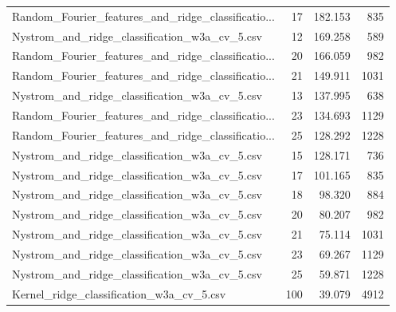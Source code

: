 \begin{tabularx}{\textwidth}{lrrr}
Random\_Fourier\_features\_and\_ridge\_classificatio... &       17 &  182.153 &           835 \\
     Nystrom\_and\_ridge\_classification\_w3a\_cv\_5.csv &       12 &  169.258 &           589 \\
Random\_Fourier\_features\_and\_ridge\_classificatio... &       20 &  166.059 &           982 \\
Random\_Fourier\_features\_and\_ridge\_classificatio... &       21 &  149.911 &          1031 \\
     Nystrom\_and\_ridge\_classification\_w3a\_cv\_5.csv &       13 &  137.995 &           638 \\
Random\_Fourier\_features\_and\_ridge\_classificatio... &       23 &  134.693 &          1129 \\
Random\_Fourier\_features\_and\_ridge\_classificatio... &       25 &  128.292 &          1228 \\
     Nystrom\_and\_ridge\_classification\_w3a\_cv\_5.csv &       15 &  128.171 &           736 \\
     Nystrom\_and\_ridge\_classification\_w3a\_cv\_5.csv &       17 &  101.165 &           835 \\
     Nystrom\_and\_ridge\_classification\_w3a\_cv\_5.csv &       18 &   98.320 &           884 \\
     Nystrom\_and\_ridge\_classification\_w3a\_cv\_5.csv &       20 &   80.207 &           982 \\
     Nystrom\_and\_ridge\_classification\_w3a\_cv\_5.csv &       21 &   75.114 &          1031 \\
     Nystrom\_and\_ridge\_classification\_w3a\_cv\_5.csv &       23 &   69.267 &          1129 \\
     Nystrom\_and\_ridge\_classification\_w3a\_cv\_5.csv &       25 &   59.871 &          1228 \\
          Kernel\_ridge\_classification\_w3a\_cv\_5.csv &      100 &   39.079 &          4912 \\
\bottomrule
\end{tabularx}
